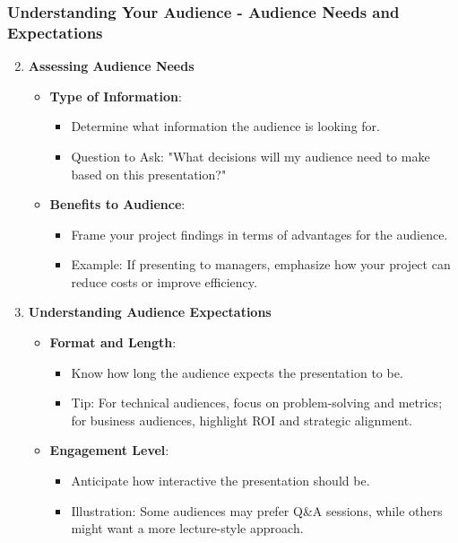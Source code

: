 \documentclass[aspectratio=169]{beamer}
\begin{document}
\begin{frame}[fragile]
    \frametitle{Understanding Your Audience - Audience Needs and Expectations}
    \begin{enumerate}
        \setcounter{enumi}{1} %
        \item \textbf{Assessing Audience Needs}
        \begin{itemize}
            \item \textbf{Type of Information}:
                \begin{itemize}
                    \item Determine what information the audience is looking for.
                    \item Question to Ask: "What decisions will my audience need to make based on this presentation?"
                \end{itemize}
            \item \textbf{Benefits to Audience}:
                \begin{itemize}
                    \item Frame your project findings in terms of advantages for the audience.
                    \item Example: If presenting to managers, emphasize how your project can reduce costs or improve efficiency.
                \end{itemize}
        \end{itemize}

        \item \textbf{Understanding Audience Expectations}
        \begin{itemize}
            \item \textbf{Format and Length}:
                \begin{itemize}
                    \item Know how long the audience expects the presentation to be.
                    \item Tip: For technical audiences, focus on problem-solving and metrics; for business audiences, highlight ROI and strategic alignment.
                \end{itemize}
            \item \textbf{Engagement Level}:
                \begin{itemize}
                    \item Anticipate how interactive the presentation should be.
                    \item Illustration: Some audiences may prefer Q\&A sessions, while others might want a more lecture-style approach.
                \end{itemize}
        \end{itemize}
    \end{enumerate}
\end{frame}
\end{document}

